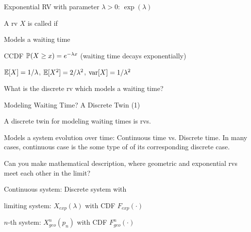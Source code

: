 \documentclass[handout,fleqn,aspectratio=169]{beamer}
\begin{document}
\begin{frame}{Exponential RV with parameter $\lambda >0$: $\exp(\lambda)$}

\plitemsep 0.02in
\bci 
\item<2-> A rv $X$ is called  if
\item<3-> Models a waiting time
\item<4-> CCDF $\mathbb{P}( X \ge x ) = e^{-\lambda x}$ (waiting time decays exponentially)
\item<5-> $\mathbb{E}[ X ] = 1/\lambda$, $\mathbb{E}[ X^2 ] = 2/\lambda^2$, $\text{var}[ X ] = 1/\lambda^2$
\item<6->  What is the discrete rv which models a waiting time?  
\eci 

\vspace{-0.5cm}
\raggedleft
{}

\end{frame}

\begin{frame}{Modeling Waiting Time? A Discrete Twin (1)}

\plitemsep 0.05in
\bci 
\item<2-> A discrete twin for modeling waiting times is  rvs. 

\item<3-> Models a system evolution over time: Continuous time vs. Discrete time. In many cases, continuous case is the some type of  of its corresponding discrete case.  

\item<4-> Can you make mathematical description, where geometric and exponential rvs meet each other in the limit? 

\item<5-> 
\bci
\item Continuous system: Discrete system with  

\eci

\item<7-> limiting system: $X_{exp}(\lambda)$ with CDF $F_{exp}(\cdot)$

\item<8-> $n$-th system: $X^n_{geo}(p_n)$  with CDF $F^n_{geo}(\cdot)$

\eci 
\end{frame}
\end{document}
